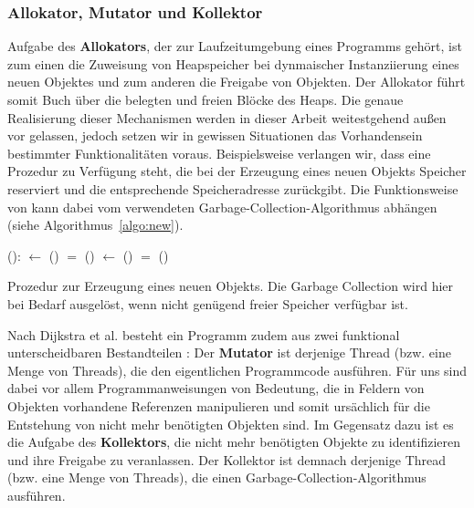 
\subsubsection*{Allokator, Mutator und Kollektor}
Aufgabe des \textbf{Allokators}, der zur Laufzeitumgebung eines Programms gehört, ist zum einen die Zuweisung von Heapspeicher bei dynmaischer Instanziierung eines neuen Objektes und zum anderen die Freigabe von Objekten.
Der Allokator führt somit Buch über die belegten und freien Blöcke des Heaps.
Die genaue Realisierung dieser Mechanismen werden in dieser Arbeit weitestgehend außen vor gelassen, jedoch setzen wir in gewissen Situationen das Vorhandensein bestimmter Funktionalitäten voraus.
Beispielsweise verlangen wir, dass eine Prozedur  zu Verfügung steht, die bei der Erzeugung eines neuen Objekts Speicher reserviert und die entsprechende Speicheradresse zurückgibt.
Die Funktionsweise von  kann dabei vom verwendeten Garbage-Collection-Algorithmus abhängen (siehe Algorithmus~\ref{algo:new}).

\begin{algorithm}
\begin{algorithmic}[1]
	\State {}():
	\State \quad {} $\gets$ ()		
	\State \quad \IF {} $=$ \Null		{}
	\State \quad \quad {}()	
	\State \quad \quad {} $\gets$ ()	
	\State \quad \quad \IF {} $=$ \Null
	\State \quad \quad \quad {}()
	\State \quad \Return {}
\end{algorithmic}
\caption[Prozedur  zur Erzeugung eines neuen Objekts]{Prozedur  zur Erzeugung eines neuen Objekts. Die Garbage Collection wird hier bei Bedarf ausgelöst, wenn nicht genügend freier Speicher verfügbar ist.}
\label{algo:new}
\end{algorithm}

Nach Dijkstra et al. besteht ein Programm zudem aus zwei funktional unterscheidbaren Bestandteilen \cite[S. 967]{dijkstra1978}:
Der \textbf{Mutator} ist derjenige Thread (bzw. eine Menge von Threads), die den eigentlichen Programmcode ausführen.
Für uns sind dabei vor allem Programmanweisungen von Bedeutung, die in Feldern von Objekten vorhandene Referenzen manipulieren und somit ursächlich für die Entstehung von nicht mehr benötigten Objekten sind.
Im Gegensatz dazu ist es die Aufgabe des \textbf{Kollektors}, die nicht mehr benötigten Objekte zu identifizieren und ihre Freigabe zu veranlassen.
Der Kollektor ist demnach derjenige Thread (bzw. eine Menge von Threads), die einen Garbage-Collection-Algorithmus ausführen.

